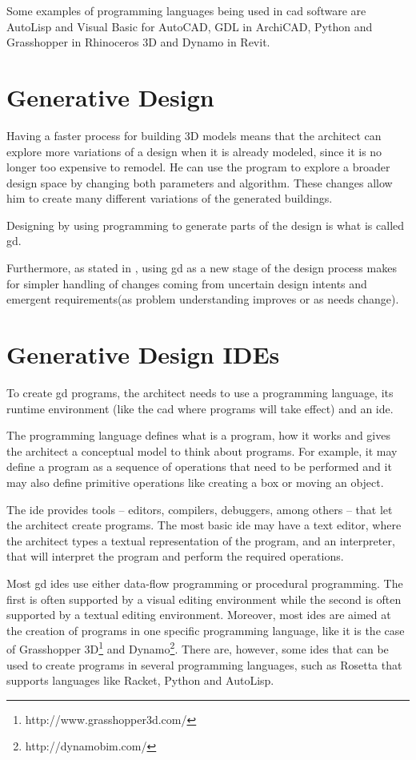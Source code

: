 Some examples of programming languages being used in \gls{cad} software are AutoLisp and Visual Basic for AutoCAD, GDL in ArchiCAD, Python and Grasshopper in Rhinoceros 3D and Dynamo in Revit.


\section{Generative Design}
Having a faster process for building 3D models means that the architect can explore more variations of a design when it is already modeled, since it is no longer too expensive to remodel.
He can use the program to explore a broader design space by changing both parameters and algorithm.
These changes allow him to create many different variations of the generated buildings.

Designing by using programming to generate parts of the design is what is called \gls{gd}.

Furthermore, as stated in \cite{leitao2014pushing}, using \gls{gd} as a new stage of the design process makes for simpler handling of changes coming from uncertain design intents and emergent requirements(as problem understanding improves or as needs change).



\section{Generative Design IDEs}
To create \gls{gd} programs, the architect needs to use a programming language, its runtime environment (like the \gls{cad} where programs will take effect) and an \gls{ide}.

The programming language defines what is a program, how it works and gives the architect a conceptual model to think about programs.
For example, it may define a program as a sequence of operations that need to be performed and it may also define primitive operations like creating a box or moving an object.

The \gls{ide} provides tools -- editors, compilers, debuggers, among others -- that let the architect create programs.
The most basic \gls{ide} may have a text editor, where the architect types a textual representation of the program, and an interpreter, that will interpret the program and perform the required operations.

Most \gls{gd} \glspl{ide} use either data-flow programming or procedural programming.
The first is often supported by a visual editing environment while the second is often supported by a textual editing environment.
Moreover, most \glspl{ide} are aimed at the creation of programs in one specific programming language, like it is the case of Grasshopper 3D\footnote{http://www.grasshopper3d.com/} and Dynamo\footnote{http://dynamobim.com/}.
There are, however, some \glspl{ide} that can be used to create programs in several programming languages, such as Rosetta\cite{de2012modern} that supports languages like Racket, Python and AutoLisp.

